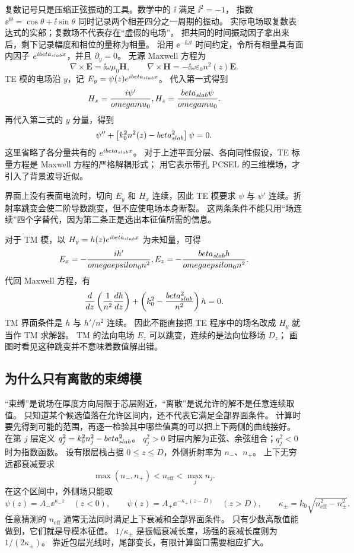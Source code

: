复数记号只是压缩正弦振动的工具。数学中的 $\ii$ 满足 $\ii^2=-1$，
指数 $\ee^{\ii\theta}=\cos\theta+\ii\sin\theta$ 同时记录两个相差四分之一周期的振动。
实际电场取复数表达式的实部；复数场不代表存在“虚假的电场”。
把共同的时间振动因子拿出来后，剩下记录幅度和相位的量称为相量。
沿用 $\ee^{-\ii\omega t}$ 时间约定，令所有相量具有面内因子
$e^{ibeta_{slab} x}$，并且 $\partial_y=0$。
无源 Maxwell 方程为
\[
\nabla\times\mathbf E=\ii\omega\mu_0\mathbf H,\qquad
\nabla\times\mathbf H=-\ii\omega\varepsilon_0 n^2(z)\mathbf E.
\]
TE 模的电场沿 $y$，记 $E_y=\psi(z)e^{ibeta_{slab} x}$。
代入第一式得到
\[
H_x=\frac{i\psi'}{omegamu_0},
H_z=\frac{beta_{slab}\psi}{omegamu_0}.
\]
再代入第二式的 $y$ 分量，得到
\begin{equation}
\psi''+\left[k_0^2n^2(z)-beta_{slab}^2\right]\psi=0.
\label{eq:slab_waveguide}
\end{equation}
这里省略了各分量共有的 $e^{ibeta_{slab} x}$。
对于上述平面分层、各向同性假设，TE 标量方程是 Maxwell 方程的严格解耦形式；
用它表示带孔 PCSEL 的三维模场，才引入了背景波导近似。

界面上没有表面电流时，切向 $E_y$ 和 $H_x$ 连续，因此 TE 模要求
$\psi$ 与 $\psi'$ 连续。折射率跳变会使二阶导数跳变，但不应使电场本身断裂。
这两条条件不能只用“场连续”四个字替代，因为第二条正是选出本征值所需的信息。

对于 TM 模，以 $H_y=h(z)e^{ibeta_{slab} x}$ 为未知量，可得
\[
E_x=-\frac{i h'}{omegaepsilon_0n^2},
E_z=-\frac{beta_{slab} h}{omegaepsilon_0n^2}.
\]
代回 Maxwell 方程，有
\begin{equation}
\frac{d}{d z}\left(\frac{1}{n^2}\frac{d h}{d z}\right)
+\left(k_0^2-\frac{beta_{slab}^2}{n^2}\right)h=0.
\label{eq:vertical_tm}
\end{equation}
TM 界面条件是 $h$ 与 $h'/n^2$ 连续。
因此不能直接把 TE 程序中的场名改成 $H_y$ 就当作 TM 求解器。
TM 的法向电场 $E_z$ 可以跳变，连续的是法向位移场 $D_z$；
画图时看见这种跳变并不意味着数值解出错。

\subsection{为什么只有离散的束缚模}
“束缚”是说场在厚度方向局限于芯层附近，“离散”是说允许的解不是任意连续取值。
只知道某个候选值落在允许区间内，还不代表它满足全部界面条件。
计算时要先得到可能的范围，再逐一检验其中哪些值真的可以把上下两侧的曲线接好。
在第 $j$ 层定义 $q_j^2=k_0^2n_j^2-beta_{slab}^2$。
$q_j^2>0$ 时层内解为正弦、余弦组合；$q_j^2<0$ 时为指数函数。
设有限层栈占据 $0\le z\le D$，外侧折射率为 $n_-$、$n_+$。
上下无穷远都衰减要求
\begin{equation}
\max(n_-,n_+)<n_{\mathrm{eff}}<\max_j n_j.
\label{eq:vertical_bound_interval}
\end{equation}
在这个区间中，外侧场只能取
\[
\psi(z)=A_-\ee^{\kappa_-z}\quad(z<0),\qquad
\psi(z)=A_+\ee^{-\kappa_+(z-D)}\quad(z>D),
\qquad
\kappa_\pm=k_0\sqrt{n_{\mathrm{eff}}^2-n_\pm^2}.
\]
任意猜测的 $n_{\mathrm{eff}}$ 通常无法同时满足上下衰减和全部界面条件。
只有少数离散值能做到，它们就是导模本征值。
$1/\kappa_\pm$ 是振幅衰减长度，场强的衰减长度则为 $1/(2\kappa_\pm)$。
靠近包层光线时，尾部变长，有限计算窗口需要相应扩大。

